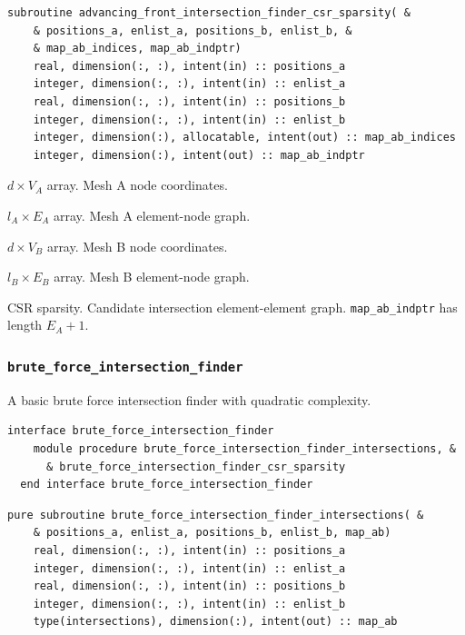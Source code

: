 \documentclass{article}
\begin{document}
\begin{lstlisting}[language=FORTRAN]
  subroutine advancing_front_intersection_finder_csr_sparsity( &
    & positions_a, enlist_a, positions_b, enlist_b, &
    & map_ab_indices, map_ab_indptr)
    real, dimension(:, :), intent(in) :: positions_a
    integer, dimension(:, :), intent(in) :: enlist_a
    real, dimension(:, :), intent(in) :: positions_b
    integer, dimension(:, :), intent(in) :: enlist_b
    integer, dimension(:), allocatable, intent(out) :: map_ab_indices
    integer, dimension(:), intent(out) :: map_ab_indptr
\end{lstlisting}

\begin{description}[font=\ttfamily\bfseries,leftmargin=2.2\parindent,labelindent=1.7\parindent,noitemsep]
  \item[positions\_a] $d \times V_A$ array. Mesh A node coordinates.
  \item[enlist\_a] $l_A \times E_A$ array. Mesh A element-node graph.
  \item[positions\_b] $d \times V_B$ array. Mesh B node coordinates.
  \item[enlist\_b] $l_B \times E_B$ array. Mesh B element-node graph.
  \item[map\_ab\_indices, map\_ab\_indptr] CSR sparsity. Candidate intersection
    element-element graph. \linebreak \verb+map_ab_indptr+ has length $E_A + 1$.
\end{description}

\subsubsection{\texttt{brute\_force\_intersection\_finder}}

A basic brute force intersection finder with quadratic complexity.

\begin{lstlisting}[language=FORTRAN]
  interface brute_force_intersection_finder
    module procedure brute_force_intersection_finder_intersections, &
      & brute_force_intersection_finder_csr_sparsity
  end interface brute_force_intersection_finder
\end{lstlisting}

\begin{lstlisting}[language=FORTRAN]
  pure subroutine brute_force_intersection_finder_intersections( &
    & positions_a, enlist_a, positions_b, enlist_b, map_ab)
    real, dimension(:, :), intent(in) :: positions_a
    integer, dimension(:, :), intent(in) :: enlist_a
    real, dimension(:, :), intent(in) :: positions_b
    integer, dimension(:, :), intent(in) :: enlist_b
    type(intersections), dimension(:), intent(out) :: map_ab
\end{lstlisting}
\end{document}
